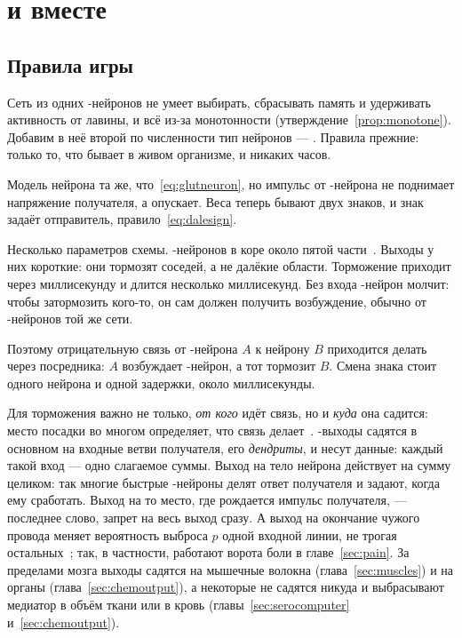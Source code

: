 \chapter{ и  вместе}
\label{sec:gaba}

\section{Правила игры}

Сеть из одних -нейронов не умеет выбирать, сбрасывать память и удерживать активность от лавины, и всё из-за монотонности (утверждение~\ref{prop:monotone}). Добавим в неё второй по численности тип нейронов --- . Правила прежние: только то, что бывает в живом организме, и никаких часов.

Модель нейрона та же, что~\eqref{eq:glutneuron}, но импульс от -нейрона не поднимает напряжение получателя, а опускает. Веса теперь бывают двух знаков, и знак задаёт отправитель, правило~\eqref{eq:dalesign}.

Несколько параметров схемы. -нейронов в коре около пятой части~\cite{Markram2004}. Выходы у них короткие: они тормозят соседей, а не далёкие области. Торможение приходит через миллисекунду и длится несколько миллисекунд. Без входа -нейрон молчит: чтобы затормозить кого-то, он сам должен получить возбуждение, обычно от -нейронов той же сети.

Поэтому отрицательную связь от -нейрона $A$ к нейрону $B$ приходится делать через посредника: $A$ возбуждает -нейрон, а тот тормозит $B$. Смена знака стоит одного нейрона и одной задержки, около миллисекунды.

Для торможения важно не только, \emph{от кого} идёт связь, но и \emph{куда} она садится: место посадки во многом определяет, что связь делает~\cite{Markram2004}. -выходы садятся в основном на входные ветви получателя, его \emph{дендриты}, и несут данные: каждый такой вход --- одно слагаемое суммы. Выход на тело нейрона действует на сумму целиком: так многие быстрые -нейроны делят ответ получателя и задают, когда ему сработать. Выход на то место, где рождается импульс получателя, --- последнее слово, запрет на весь выход сразу. А выход на окончание чужого провода меняет вероятность выброса $p$ одной входной линии, не трогая остальных~\cite{Rudomin1999}; так, в частности, работают ворота боли в главе~\ref{sec:pain}. За пределами мозга выходы садятся на мышечные волокна (глава~\ref{sec:muscles}) и на органы (глава~\ref{sec:chemoutput}), а некоторые не садятся никуда и выбрасывают медиатор в объём ткани или в кровь (главы~\ref{sec:serocomputer} и~\ref{sec:chemoutput}).

